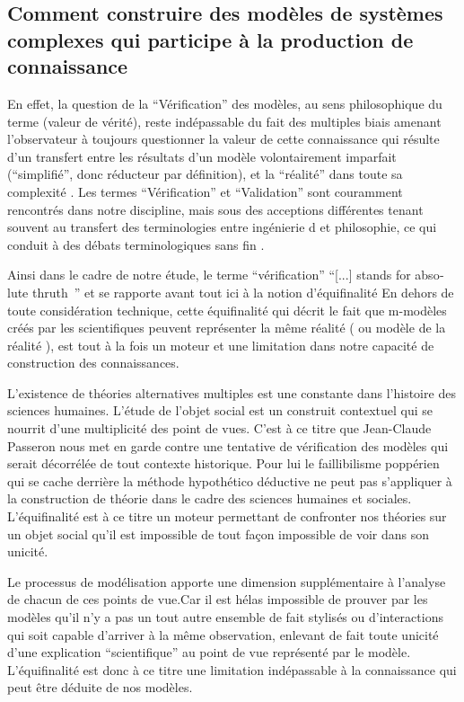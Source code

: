 \subsection{Comment construire des modèles de systèmes complexes qui participe à la production de connaissance}

En effet, la question de la \enquote{Vérification} des modèles, au sens philosophique du terme (valeur de vérité), reste indépassable du fait des multiples biais amenant l'observateur à toujours questionner la valeur de cette connaissance qui résulte d'un transfert entre les résultats d'un modèle volontairement imparfait (\enquote{simplifié}, donc réducteur par définition), et la \enquote{réalité} dans toute sa complexité \autocite{OSullivan2004}. Les termes \enquote{Vérification} et  \enquote{Validation} sont couramment rencontrés dans notre discipline, mais sous des acceptions différentes tenant souvent au transfert des terminologies entre ingénierie \autocite{Sargent1984} d\autocite{Balci1998} et philosophie, ce qui conduit à  des débats terminologiques sans fin \autocite{David2009}. 

Ainsi dans le cadre de notre étude, le terme \enquote{vérification}  \foreignquote{english}{[...] stands for absolute thruth } \autocite{David2009} \autocite{Oreskes1994} et se rapporte avant tout ici à la notion d'équifinalité \autocite{OSullivan2004} En dehors de toute considération technique, cette équifinalité qui décrit le fait que m-modèles créés par les scientifiques peuvent représenter la même réalité ( ou modèle de la réalité ), est tout à la fois un moteur et une limitation dans notre capacité de construction des connaissances. 

L’existence de théories alternatives multiples est une constante dans l’histoire des sciences humaines. L'étude de l'objet social est un construit contextuel qui se nourrit d'une multiplicité des point de vues. C'est à ce titre que Jean-Claude Passeron \autocite{Passeron2006} nous met en garde contre une tentative de vérification des modèles qui serait décorrélée de tout contexte historique. Pour lui le faillibilisme poppérien qui se cache derrière la méthode hypothético déductive ne peut pas s'appliquer à la construction de théorie dans le cadre des sciences humaines et sociales. L'équifinalité est à ce titre un moteur permettant de confronter nos théories sur un objet social  qu'il est impossible de tout façon impossible de voir dans son unicité. 

Le processus de modélisation apporte une dimension supplémentaire à l'analyse de chacun de ces points de vue.Car il est hélas impossible de prouver par les modèles qu'il n'y a pas un tout autre ensemble de fait stylisés ou d'interactions qui soit capable d'arriver à la même observation, enlevant de fait toute unicité d’une explication \enquote{scientifique} au point de vue représenté par le modèle. L'équifinalité est donc à ce titre une limitation indépassable à la connaissance qui peut être déduite de nos modèles.

